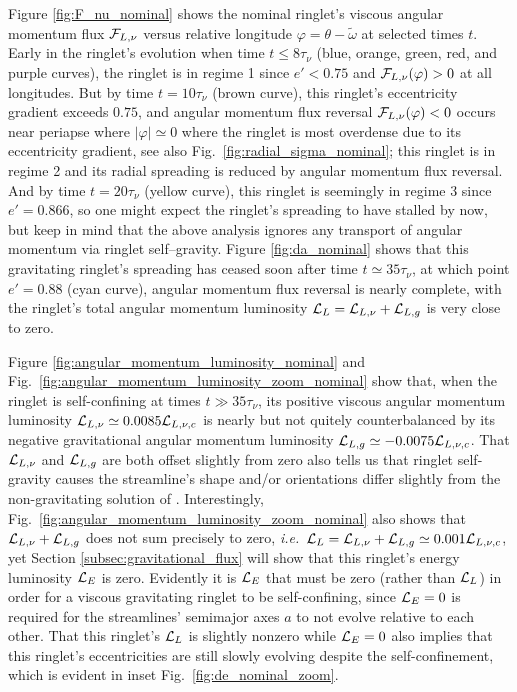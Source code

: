 \documentclass[preprint]{aastex62}
\begin{document}
Figure \ref{fig:F_nu_nominal} shows the nominal ringlet's viscous angular momentum flux
${\cal F}_{L,\nu}$ versus relative longitude $\varphi=\theta-\tilde{\omega}$ at selected times $t$.
Early in the ringlet's evolution when time $t \le 8\tau_\nu$ (blue, orange, green, red,
and purple curves),
the ringlet is in regime 1 since $e'<0.75$ and ${\cal F}_{L,\nu}(\varphi)>0$ at all longitudes.
But by time $t = 10\tau_\nu$ (brown curve), this ringlet's eccentricity gradient exceeds $0.75$,
and angular momentum flux reversal ${\cal F}_{L,\nu}(\varphi)<0$ occurs near periapse where $|\varphi|\simeq0$
where the ringlet is most overdense due to its eccentricity gradient, see 
also Fig.\ \ref{fig:radial_sigma_nominal};
this ringlet is in regime 2 and its radial spreading is reduced by angular momentum flux reversal. 
And by time $t = 20\tau_\nu$ (yellow curve), this ringlet is seemingly in regime 3
since $e'=0.866$, so one might expect the ringlet's spreading to have stalled by
now, but keep in mind that the above analysis ignores any transport
of angular momentum via ringlet self--gravity. Figure \ref{fig:da_nominal}
shows that this gravitating ringlet's spreading has ceased soon after time $t \simeq35\tau_\nu$, 
at which point $e'=0.88$ (cyan curve), angular momentum flux reversal is nearly complete,
with the ringlet's total angular momentum luminosity ${\cal L}_L={\cal L}_{L,\nu}+{\cal L}_{L,g}$ is very close to zero.

Figure \ref{fig:angular_momentum_luminosity_nominal} and
Fig.\ \ref{fig:angular_momentum_luminosity_zoom_nominal} show that, when the ringlet is self-confining
at times $t\gg35\tau_\nu$, its positive viscous angular momentum luminosity ${\cal L}_{L,\nu}\simeq0.0085{\cal L}_{L,\nu,c}$ 
is nearly but not quitely counterbalanced
by its negative gravitational angular momentum luminosity ${\cal L}_{L,g}\simeq-0.0075{\cal L}_{L,\nu,c}$. 
That ${\cal L}_{L,\nu}$ and ${\cal L}_{L,g}$
are both offset slightly from zero also tells us that ringlet self-gravity causes
the streamline's shape and/or orientations differ 
slightly from the non-gravitating solution of \citet{BGT82}. Interestingly, 
Fig.\ \ref{fig:angular_momentum_luminosity_zoom_nominal} also shows that ${\cal L}_{L,\nu}+{\cal L}_{L,g}$ does not sum
precisely to zero, {\it i.e.}\ 
${\cal L}_{L}={\cal L}_{L,\nu}+{\cal L}_{L,g}\simeq0.001{\cal L}_{L,\nu,c}$, 
yet Section \ref{subsec:gravitational_flux}
will show that this ringlet's energy luminosity ${\cal L}_E$ is zero. Evidently it is 
${\cal L}_E$ that must be zero (rather than ${\cal L}_L$) in order for a viscous gravitating ringlet
to be self-confining, since ${\cal L}_E=0$ is required for the
streamlines' semimajor axes $a$ to not evolve relative to each other.
That this ringlet's ${\cal L}_L$ is slightly nonzero while ${\cal L}_E=0$ also implies that this ringlet's
eccentricities are still slowly evolving despite the 
self-confinement, which is evident in inset Fig.\ \ref{fig:de_nominal_zoom}.
\end{document}
